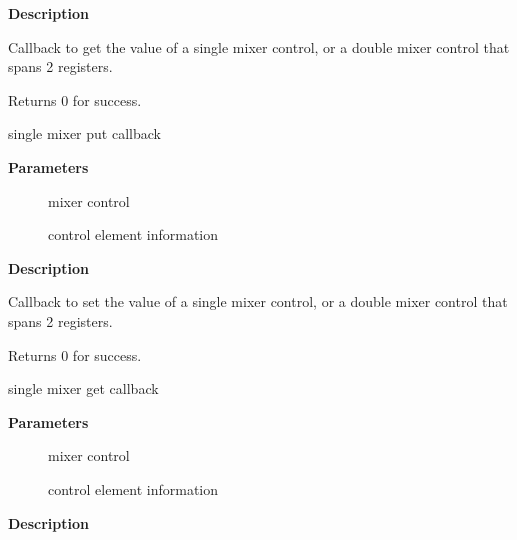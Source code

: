 \documentclass[a4paper,8pt,english]{sphinxmanual}
\begin{document}
\textbf{Description}

Callback to get the value of a single mixer control, or a double mixer
control that spans 2 registers.

Returns 0 for success.

\begin{fulllineitems}
\label{sound/kernel-api/alsa-driver-api:c.snd_soc_put_volsw}
single mixer put callback

\end{fulllineitems}


\textbf{Parameters}
\begin{description}
\item[{}] \leavevmode
mixer control

\item[{}] \leavevmode
control element information

\end{description}

\textbf{Description}

Callback to set the value of a single mixer control, or a double mixer
control that spans 2 registers.

Returns 0 for success.

\begin{fulllineitems}
\label{sound/kernel-api/alsa-driver-api:c.snd_soc_get_volsw_sx}
single mixer get callback

\end{fulllineitems}


\textbf{Parameters}
\begin{description}
\item[{}] \leavevmode
mixer control

\item[{}] \leavevmode
control element information

\end{description}

\textbf{Description}
\end{document}
